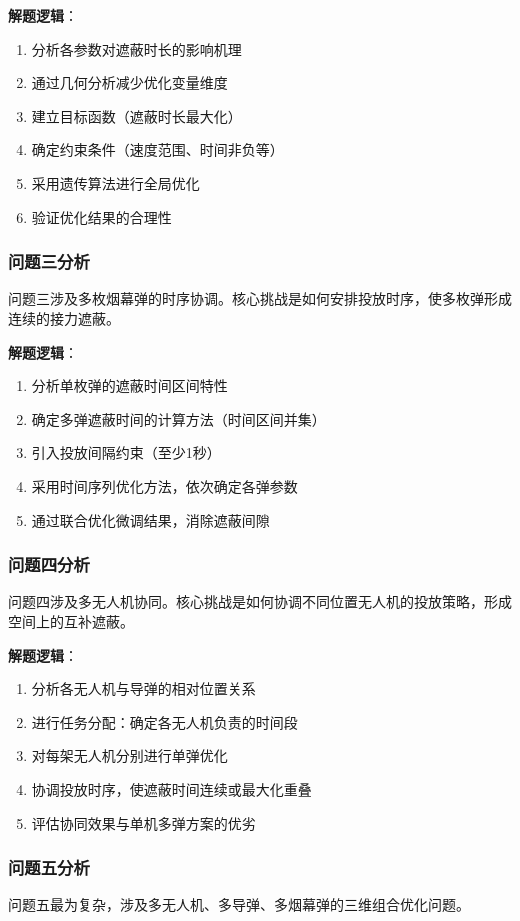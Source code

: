 \documentclass[12pt,a4paper]{article}
\begin{document}
\textbf{解题逻辑}：
\begin{enumerate}
    \item 分析各参数对遮蔽时长的影响机理
    \item 通过几何分析减少优化变量维度
    \item 建立目标函数（遮蔽时长最大化）
    \item 确定约束条件（速度范围、时间非负等）
    \item 采用遗传算法进行全局优化
    \item 验证优化结果的合理性
\end{enumerate}

\subsubsection{问题三分析}
问题三涉及多枚烟幕弹的时序协调。核心挑战是如何安排投放时序，使多枚弹形成连续的接力遮蔽。

\textbf{解题逻辑}：
\begin{enumerate}
    \item 分析单枚弹的遮蔽时间区间特性
    \item 确定多弹遮蔽时间的计算方法（时间区间并集）
    \item 引入投放间隔约束（至少1秒）
    \item 采用时间序列优化方法，依次确定各弹参数
    \item 通过联合优化微调结果，消除遮蔽间隙
\end{enumerate}

\subsubsection{问题四分析}
问题四涉及多无人机协同。核心挑战是如何协调不同位置无人机的投放策略，形成空间上的互补遮蔽。

\textbf{解题逻辑}：
\begin{enumerate}
    \item 分析各无人机与导弹的相对位置关系
    \item 进行任务分配：确定各无人机负责的时间段
    \item 对每架无人机分别进行单弹优化
    \item 协调投放时序，使遮蔽时间连续或最大化重叠
    \item 评估协同效果与单机多弹方案的优劣
\end{enumerate}

\subsubsection{问题五分析}
问题五最为复杂，涉及多无人机、多导弹、多烟幕弹的三维组合优化问题。
\end{document}
